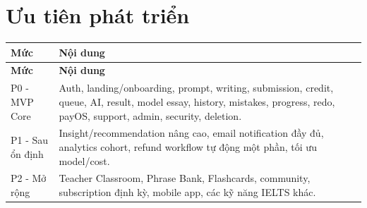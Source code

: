 \documentclass[11pt,a4paper]{article}
\begin{document}
\section{Ưu tiên phát triển}
\small
\setlength{\tabcolsep}{4pt}
\renewcommand{\arraystretch}{1.18}
\begin{longtable}{|P{0.22\textwidth}|P{0.70\textwidth}|}
\hline
\textbf{Mức} & \textbf{Nội dung} \\ \hline
\endfirsthead
\hline
\textbf{Mức} & \textbf{Nội dung} \\ \hline
\endhead
P0 - MVP Core & Auth, landing/\allowbreak{}onboarding, prompt, writing, submission, credit, queue, AI, result, model essay, history, mistakes, progress, redo, payOS, support, admin, security, deletion. \\ \hline
P1 - Sau ổn định & Insight/\allowbreak{}recommendation nâng cao, email notification đầy đủ, analytics cohort, refund workflow tự động một phần, tối ưu model/\allowbreak{}cost. \\ \hline
P2 - Mở rộng & Teacher Classroom, Phrase Bank, Flashcards, community, subscription định kỳ, mobile app, các kỹ năng IELTS khác. \\ \hline
\end{longtable}
\normalsize
\end{document}

